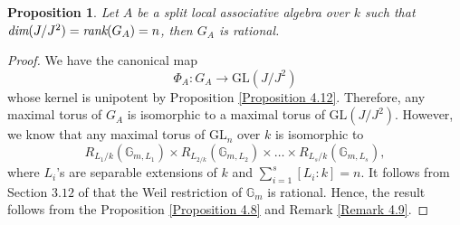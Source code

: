 \documentclass[12pt]{amsart}
\newtheorem{proposition}[theorem]{Proposition}
\theoremstyle{definition}
\numberwithin{equation}{section}
\begin{document}
\begin{proposition}\label{Proposition 4.14}
Let $A$ be a split local associative algebra over $k$ such that $\emph{dim}(J/J^2)=\emph{rank}(G_A)=n$, then $G_A$ is rational.
\end{proposition}
\vskip1mm
\begin{proof}
We have the canonical map 
\begin{equation*}
\Phi_A: G_A \rightarrow \text{GL}(J/J^2)
\end{equation*}
whose kernel is unipotent by Proposition \ref{Proposition 4.12}. Therefore, any maximal torus of $G_A$ is isomorphic to a maximal torus of $\text{GL}(J/J^2)$. However, we know that any maximal torus of $\text{GL}_n$ over $k$ is isomorphic to \[R_{L_{1}/k}(\mathbb{G}_{m, L_1})\times R_{L_{2/k}}(\mathbb{G}_{m, L_{2}})\times\dots \times R_{L_{s}/k}(\mathbb{G}_{m,L_s}),\] where $L_i$'s are separable extensions of $k$ and $\sum_{i=1}^s[L_i:k]=n$. It follows from Section $3.12$ of \cite{Voskrenskii} that the Weil restriction of $\mathbb{G}_m$ is rational. Hence, the result follows from the Proposition \ref{Proposition 4.8} and Remark \ref{Remark 4.9}.
\end{proof}
\vskip2mm
\end{document}
